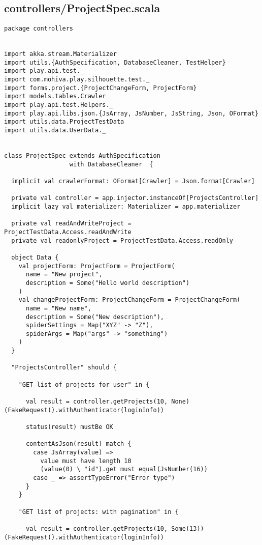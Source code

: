\subsection{controllers/ProjectSpec.scala}
\begin{lstlisting}
package controllers


import akka.stream.Materializer
import utils.{AuthSpecification, DatabaseCleaner, TestHelper}
import play.api.test._
import com.mohiva.play.silhouette.test._
import forms.project.{ProjectChangeForm, ProjectForm}
import models.tables.Crawler
import play.api.test.Helpers._
import play.api.libs.json.{JsArray, JsNumber, JsString, Json, OFormat}
import utils.data.ProjectTestData
import utils.data.UserData._


class ProjectSpec extends AuthSpecification
                  with DatabaseCleaner  {

  implicit val crawlerFormat: OFormat[Crawler] = Json.format[Crawler]

  private val controller = app.injector.instanceOf[ProjectsController]
  implicit lazy val materializer: Materializer = app.materializer
  
  private val readAndWriteProject = ProjectTestData.Access.readAndWrite
  private val readonlyProject = ProjectTestData.Access.readOnly

  object Data {
    val projectForm: ProjectForm = ProjectForm(
      name = "New project",
      description = Some("Hello world description")
    )
    val changeProjectForm: ProjectChangeForm = ProjectChangeForm(
      name = "New name",
      description = Some("New description"),
      spiderSettings = Map("XYZ" -> "Z"),
      spiderArgs = Map("args" -> "something")
    )
  }

  "ProjectsController" should {

    "GET list of projects for user" in {

      val result = controller.getProjects(10, None)(FakeRequest().withAuthenticator(loginInfo))

      status(result) mustBe OK

      contentAsJson(result) match {
        case JsArray(value) =>
          value must have length 10
          (value(0) \ "id").get must equal(JsNumber(16))
        case _ => assertTypeError("Error type")
      }
    }

    "GET list of projects: with pagination" in {

      val result = controller.getProjects(10, Some(13))(FakeRequest().withAuthenticator(loginInfo))


\end{lstlisting}

